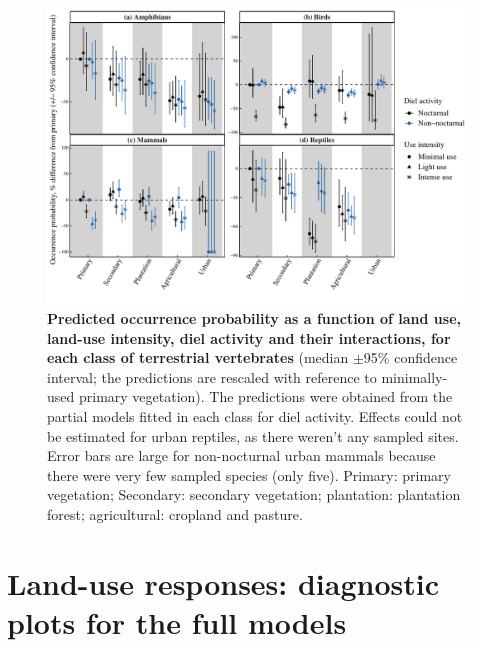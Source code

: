 \documentclass[11pt]{article}
\begin{document}
\begin{figure}[h!]
\centering
\includegraphics[scale=0.7]{Figures/Partial_models_predictions/Diel_activity}
\caption[Predicted occurrence probability as a function of land use, land-use intensity, diel activity and their interactions in each class]{\textbf{Predicted occurrence probability as a function of land use, land-use intensity, diel activity and their interactions, for each class of terrestrial vertebrates} (median $\pm$95\% confidence interval; the predictions are rescaled with reference to minimally-used primary vegetation). The predictions were obtained from the partial models fitted in each class for diel activity. Effects could not be estimated for urban reptiles, as there weren't any sampled sites. Error bars are large for non-nocturnal urban mammals because there were very few sampled species (only five).  Primary: primary vegetation; Secondary: secondary vegetation; plantation: plantation forest; agricultural: cropland and pasture.}
\label{SI_4_Figure11}
\end{figure}


\clearpage
\section{Land-use responses: diagnostic plots for the full models} 
\end{document}
